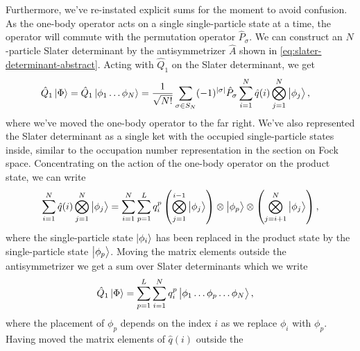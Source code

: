         Furthermore, we've re-instated explicit sums for the moment to avoid
        confusion.
        As the one-body operator acts on a single single-particle state at a
        time, the operator will commute with the permutation operator
        $\hat{P}_{\sigma}$.
        We can construct an $N$-particle Slater determinant by the
        antisymmetrizer $\hat{A}$ shown in
        \autoref{eq:slater-determinant-abstract}.
        Acting with $\hat{Q}_1$ on the Slater determinant, we get
        \begin{align}
            \hat{Q}_1\ket{\Phi}
            &=
            \hat{Q}_1\ket{\phi_1\dots\phi_N}
            =
            \frac{1}{\sqrt{N!}}
            \sum_{\sigma \in S_N}
            (-1)^{\abs{\sigma}}
            \hat{P}_{\sigma}
            \sum_{i = 1}^{N}\hat{q}(i)
            \bigotimes_{j = 1}^{N}
            \ket{\phi_j},
        \end{align}
        where we've moved the one-body operator to the far right.
        We've also represented the Slater determinant as a single ket with the
        occupied single-particle states inside, similar to the occupation number
        representation in the section on Fock space.
        Concentrating on the action of the one-body operator on the product
        state, we can write
        \begin{align}
            \sum_{i = 1}^{N}\hat{q}(i)
            \bigotimes_{j = 1}^{N}
            \ket{\phi_j}
            =
            \sum_{i = 1}^{N}
            \sum_{p = 1}^{L}
            q^{p}_{i}
            \left( 
                \bigotimes_{j = 1}^{i - 1}
                \ket{\phi_j}
             \right)
            \otimes \ket{\phi_p}
            \otimes \left( 
                \bigotimes_{j = i + 1}^{N}
                \ket{\phi_j}
             \right),
        \end{align}
        where the single-particle state $\ket{\phi_i}$ has been replaced in the
        product state by the single-particle state $\ket{\phi_p}$.
        Moving the matrix elements outside the antisymmetrizer we get a sum over
        Slater determinants which we write
        \begin{align}
            \hat{Q}_1\ket{\Phi}
            &=
            \sum_{p = 1}^{L}
            \sum_{i = 1}^{N}q^{p}_{i}
            \ket{\phi_1\dots\phi_p\dots\phi_N},
        \end{align}
        where the placement of $\phi_p$ depends on the index $i$ as we replace
        $\phi_i$ with $\phi_p$.
        Having moved the matrix elements of $\hat{q}(i)$ outside the
